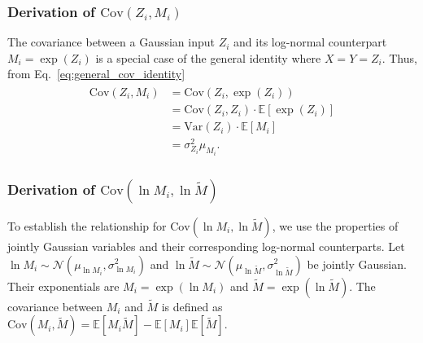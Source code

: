 \documentclass{uai2026} %
\begin{document}
\subsubsection{Derivation of $\mathrm{Cov}(Z_i, M_i)$}\label{app:cov_z_m}
The covariance between a Gaussian input $Z_i$ and its log-normal counterpart $M_i = \exp(Z_i)$ is a special case of the general identity where $X = Y = Z_i$. Thus, from Eq.~\eqref{eq:general_cov_identity}
\begin{align}
\label{eq:cov_x_e_x}
\begin{split}
\text{Cov}(Z_i, M_i) &= \text{Cov}(Z_i, \exp({Z_i})) \\
&= \text{Cov}(Z_i, Z_i) \cdot \mathbb{E}[\exp({Z_i})] \\
&= \text{Var}(Z_i) \cdot \mathbb{E}[M_i] \\
&= \sigma_{Z_i}^2 \mu_{M_i}.
\end{split}
\end{align}

\subsubsection{Derivation of $\mathrm{Cov}(\ln M_i, \ln \tilde{M})$}
\label{app:log_space_covariance}
To establish the relationship for $\text{Cov}(\ln M_i, \ln \tilde{M})$, we use the properties of jointly Gaussian variables and their corresponding log-normal counterparts. Let $\ln M_i \sim \mathcal{N}(\mu_{\ln M_i}, \sigma_{\ln M_i}^2)$ and $\ln \tilde{M} \sim \mathcal{N}(\mu_{\ln \tilde{M}}, \sigma_{\ln \tilde{M}}^2)$ be jointly Gaussian. Their exponentials are $M_i = \exp(\ln M_i)$ and $\tilde{M} = \exp(\ln \tilde{M})$. The covariance between $M_i$ and $\tilde{M}$ is defined as $\text{Cov}(M_i, \tilde{M}) = \mathbb{E}[M_i \tilde{M}] - \mathbb{E}[M_i]\mathbb{E}[\tilde{M}]$.
\end{document}
